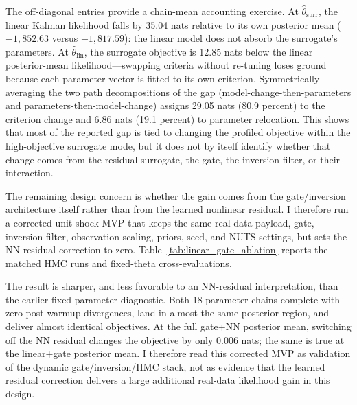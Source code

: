 \documentclass[12pt]{article}
\theoremstyle{plain}
\theoremstyle{definition}
\theoremstyle{remark}
\begin{document}
The off-diagonal entries provide a chain-mean accounting exercise. At $\hat{\theta}_{\text{surr}}$, the linear Kalman likelihood falls by 35.04 nats relative to its own posterior mean ($-1{,}852.63$ versus $-1{,}817.59$): the linear model does not absorb the surrogate's parameters. At $\hat{\theta}_{\text{lin}}$, the surrogate objective is 12.85 nats below the linear posterior-mean likelihood---swapping criteria without re-tuning loses ground because each parameter vector is fitted to its own criterion. Symmetrically averaging the two path decompositions of the gap (model-change-then-parameters and parameters-then-model-change) assigns 29.05 nats (80.9 percent) to the criterion change and 6.86 nats (19.1 percent) to parameter relocation. This shows that most of the reported gap is tied to changing the profiled objective within the high-objective surrogate mode, but it does not by itself identify whether that change comes from the residual surrogate, the gate, the inversion filter, or their interaction.

The remaining design concern is whether the gain comes from the gate/inversion architecture itself rather than from the learned nonlinear residual. I therefore run a corrected unit-shock MVP that keeps the same real-data payload, gate, inversion filter, observation scaling, priors, seed, and NUTS settings, but sets the NN residual correction to zero. Table~\ref{tab:linear_gate_ablation} reports the matched HMC runs and fixed-theta cross-evaluations.

The result is sharper, and less favorable to an NN-residual interpretation, than the earlier fixed-parameter diagnostic. Both 18-parameter chains complete with zero post-warmup divergences, land in almost the same posterior region, and deliver almost identical objectives. At the full gate+NN posterior mean, switching off the NN residual changes the objective by only \(0.006\) nats; the same is true at the linear+gate posterior mean. I therefore read this corrected MVP as validation of the dynamic gate/inversion/HMC stack, not as evidence that the learned residual correction delivers a large additional real-data likelihood gain in this design.
\end{document}
